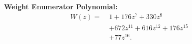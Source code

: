 \begin{tcolorbox}[enhanced, breakable, colback=white, colframe=black, title={Detailed Analysis: Discovery of {[22,11,7]} Code}]
\tcbline

\textbf{Weight Enumerator Polynomial:}\\
\begin{align*}
W(z) =\; & 1 + 176z^7 + 330z^8 \\ 
&+ 672z^{11} + 616z^{12} + 176z^{15} \\
&+ 77z^{16}.
\end{align*}
\end{tcolorbox}
